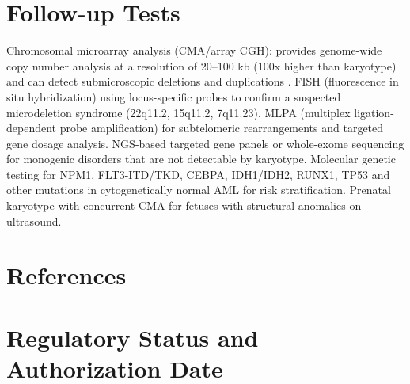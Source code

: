 \section*{Follow-up Tests}
Chromosomal microarray analysis (CMA/array CGH): provides genome-wide copy number analysis at a resolution of 20--100 kb (100x higher than karyotype) and can detect submicroscopic deletions and duplications \cite{miller2010consensus, south2013acmg}. FISH (fluorescence in situ hybridization) using locus-specific probes to confirm a suspected microdeletion syndrome (22q11.2, 15q11.2, 7q11.23). MLPA (multiplex ligation-dependent probe amplification) for subtelomeric rearrangements and targeted gene dosage analysis. NGS-based targeted gene panels or whole-exome sequencing for monogenic disorders that are not detectable by karyotype. Molecular genetic testing for NPM1, FLT3-ITD/TKD, CEBPA, IDH1/IDH2, RUNX1, TP53 and other mutations in cytogenetically normal AML for risk stratification. Prenatal karyotype with concurrent CMA for fetuses with structural anomalies on ultrasound.

\section*{References}


\clearpage
\section*{Regulatory Status and Authorization Date}

\clearpage
